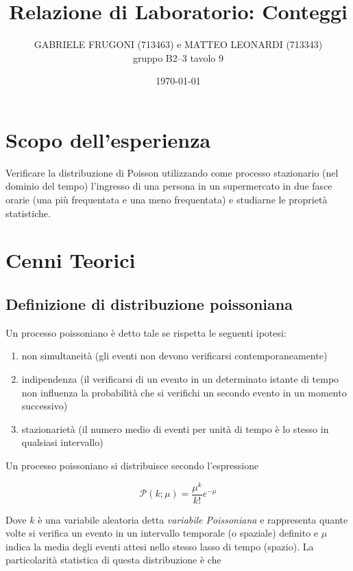 \documentclass[a4paper,12pt]{article}
\title{Relazione di Laboratorio: Conteggi}       %
\author{GABRIELE FRUGONI (713463) e MATTEO LEONARDI (713343)\\ gruppo B2--3 tavolo 9}
\date{\today}
\begin{document}
\maketitle

\section{Scopo dell'esperienza}

Verificare la distribuzione di Poisson utilizzando come processo stazionario (nel dominio del tempo) l'ingresso di una persona in un supermercato in due fasce orarie (una più frequentata e una meno frequentata) e studiarne le proprietà statistiche.

\section{Cenni Teorici}

\subsection{Definizione di distribuzione poissoniana}\label{sec:hp_poissoniane}

Un processo poissoniano è detto tale se rispetta le seguenti ipotesi:

\begin{enumerate}
    \item non simultaneità (gli eventi non devono verificarsi contemporaneamente)
    \item indipendenza (il verificarsi di un evento in un determinato istante di tempo non influenza la probabilità che si verifichi un secondo evento in un momento successivo)
    \item stazionarietà (il numero medio di eventi per unità di tempo è lo stesso in qualsiasi intervallo)
\end{enumerate}

Un processo poissoniano si distribuisce secondo l'espressione

\begin{equation}
    \mathcal{P} (k;\mu) = \dfrac{\mu^k}{k!}e^{-\mu}
    \label{eq:poisson}
\end{equation}

Dove $k$ è una variabile aleatoria detta \textit{variabile Poissoniana} e rappresenta quante volte si verifica un evento in un intervallo temporale (o spaziale) definito e $\mu$ indica la media degli eventi attesi nello stesso lasso di tempo (spazio).
La particolarità statistica di questa distribuzione è che
\end{document}
